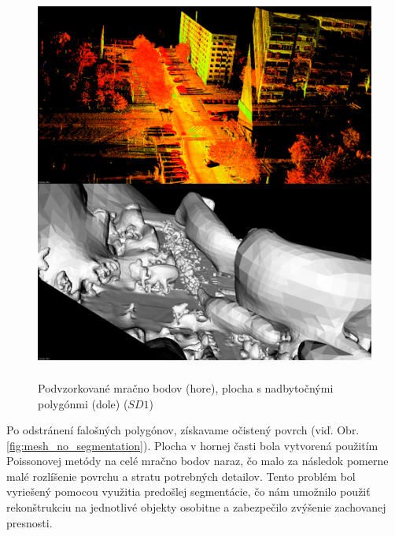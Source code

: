 \begin{figure}[!htbp]
  \centering
  \includegraphics[width=16cm, height=13cm]{img/mesh_bad_polygons.png}
  \caption{Podvzorkované mračno bodov (hore), plocha s nadbytočnými polygónmi (dole) ($SD1$)} 
  \label{fig:mesh_bad_polygons}
\end{figure} 

\indent Po odstránení falošných polygónov, získavame očistený povrch (viď. Obr. \ref{fig:mesh_no_segmentation}). Plocha v hornej časti bola vytvorená použitím Poissonovej metódy na celé mračno bodov naraz, čo malo za následok pomerne malé rozlíšenie povrchu a stratu potrebných detailov. Tento problém bol vyriešený pomocou využitia predošlej segmentácie, čo nám umožnilo použiť rekonštrukciu na jednotlivé objekty osobitne a zabezpečilo zvýšenie zachovanej presnosti.

